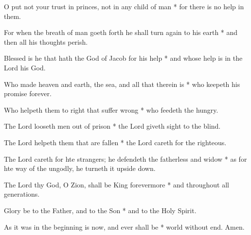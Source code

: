 \begin{multicols}{2}
	O put not your trust in princes, not in any child of man * for there is no help in them.
	
	For when the breath of man goeth forth he shall turn again to his earth * and then all his thoughts perish.
	
	Blessed is he that hath the God of Jacob for his help * and whose help is in the Lord his God.
	
	Who made heaven and earth, the sea, and all that therein is * who keepeth his promise forever.
	
	Who helpeth them to right that suffer wrong * who feedeth the hungry.
	
	The Lord looseth men out of prison * the Lord giveth sight to the blind.
	
	The Lord helpeth them that are fallen * the Lord careth for the righteous.
	
	The Lord careth for hte strangers; he defendeth the fatherless and widow * as for hte way of the ungodly, he turneth it upside down.
	
	The Lord thy God, O Zion, shall be King forevermore * and throughout all generations.
	
	Glory be to the Father, and to the Son * and to the Holy Spirit.
	
	As it was in the beginning is now, and ever shall be * world without end. Amen.
\end{multicols}